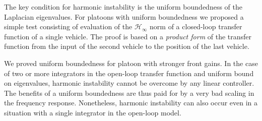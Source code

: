 \documentclass[technote, 10pt, twoside]{IEEEtran}
\theoremstyle{plain}
\theoremstyle{definition}
\theoremstyle{assump}
\begin{document}
The key condition for harmonic
instability is the uniform boundedness of the Laplacian eigenvalues. For
platoons with uniform boundedness we proposed a simple
test consisting of evaluation of the
$\mathcal{H}_{\infty}$ norm of a closed-loop transfer function of a single
vehicle.
The proof is based on a \textit{product form} of the transfer function
from the input of the second vehicle to the position of the last vehicle. 

We proved uniform boundedness for platoon with stronger front gains. In the case
of two or more integrators in the open-loop transfer function and uniform bound
on eigenvalues, harmonic instability cannot be overcome by any linear
controller.
The benefits of a uniform boundedness are thus
paid for by a very bad scaling in the frequency response.
Nonetheless, harmonic instability can also occur even in a situation with a single integrator in the
open-loop model.



\appendices
\end{document}
